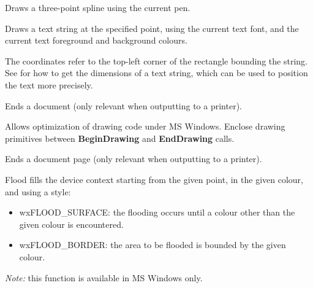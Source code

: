 Draws a three-point spline using the current pen.

\label{wxdcdrawtext}


Draws a text string at the specified point, using the current text font,
and the current text foreground and background colours.

The coordinates refer to the top-left corner of the rectangle bounding
the string. See  for how
to get the dimensions of a text string, which can be used to position the
text more precisely.



Ends a document (only relevant when outputting to a printer).



Allows optimization of drawing code under MS Windows. Enclose
drawing primitives between {\bf BeginDrawing} and {\bf EndDrawing}\rtfsp
calls.



Ends a document page (only relevant when outputting to a printer).



Flood fills the device context starting from the given point, in the given colour,
and using a style:

\begin{itemize}\itemsep=0pt
\item wxFLOOD\_SURFACE: the flooding occurs until a colour other than the given colour is encountered.
\item wxFLOOD\_BORDER: the area to be flooded is bounded by the given colour.
\end{itemize}

{\it Note:} this function is available in MS Windows only.



